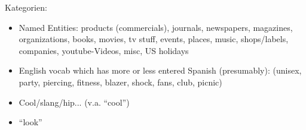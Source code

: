 Kategorien:
\begin{itemize}
  \item Named Entities: products (commercials), journals, newspapers, magazines, organizations, books, movies, tv stuff, events, places, music, shops/labels, companies, youtube-Videos, misc, US holidays
  \item English vocab which has more or less entered Spanish (presumably): (unisex, party, piercing, fitness, blazer, shock, fans, club, picnic) %
  \item Cool/slang/hip... (v.a. ``cool'')
  \item ``look'' %
    \begin{comment}
      [BolChi07]
      "Finally, capitalist restructuring over the last two decades -which, as we have seen, occurred around financial markets and merger-acquisition activities in a context of favourable government policies as regards taxation, social security and wages - was also accopmanied by significant inventives to greater labour flexibility. Opportunities for hiring on a temporary basis, using a temporary workforce, flexible hours, and a reduction in the costs of layoffs, have developed considerably in all the OECD countries, gradually whittling down the social security systems established during a century of social struggles." (p.xxxviii, Prologue) <-- damit sind die 70er und 80er gemeint
      "This process was widely encouraged by a significant number of the protesters of the era, who were especially sensitive to the themes of the artistic critique - that is to say the everyday oppression and sterilization of each person's creative, unique powers produced by industrial, bourgeois society. The tranformation in working methods was thus effected in large part to respond to their aspirations, and they themselves contributed to it, especially after the left's accession to government in the 1980s. Once again, one cannot fail to stress the fact that critique was effective." (p.199, 1968: The Crisis and Revival of Capitalism)
      "Correlatively, however, at the level of security and wages various gains of the previous period were clawed back - not directly, but via new mechanisms that were much less supervised and protective than the old full-time permanent contact which was the standard norm in the 1960s. Autonomy was exchanged for security, opening the way for a new spirit of capitalism extolling the virtues of mobility and adaptability." (p.199)

\end{comment}
\end{itemize}
